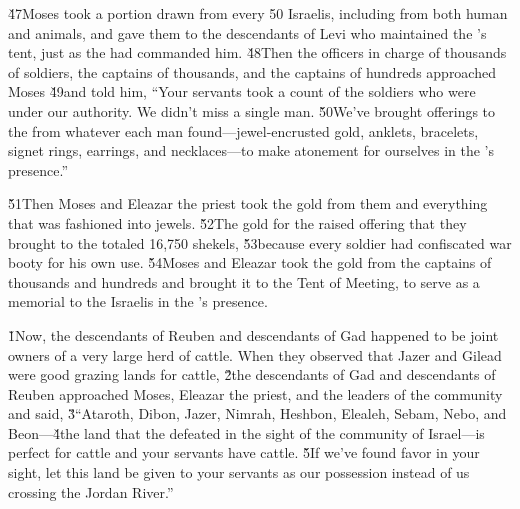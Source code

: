 \v{47}Moses took a portion drawn from every 50 Israelis, including from both human and animals, and gave them to the descendants of Levi who maintained the 's tent, just as the  had commanded him. \v{48}Then the officers in charge of thousands of soldiers, the captains of thousands, and the captains of hundreds approached Moses \v{49}and told him, ``Your servants took a count of the soldiers who were under our authority. We didn't miss a single man. \v{50}We've brought offerings to the  from whatever each man found---jewel-encrusted gold, anklets, bracelets, signet rings, earrings, and necklaces---to make atonement for ourselves in the 's presence.''

\v{51}Then Moses and Eleazar the priest took the gold from them and everything that was fashioned into jewels. \v{52}The gold for the raised offering that they brought to the  totaled 16,750 shekels, \v{53}because every soldier had confiscated war booty for his own use. \v{54}Moses and Eleazar took the gold from the captains of thousands and hundreds and brought it to the Tent of Meeting, to serve as a memorial to the Israelis in the 's presence.

\v{1}Now, the descendants of Reuben and descendants of Gad happened to be joint owners of a very large herd of cattle. When they observed that Jazer and Gilead were good grazing lands for cattle, \v{2}the descendants of Gad and descendants of Reuben approached Moses, Eleazar the priest, and the leaders of the community and said, \v{3}``Ataroth, Dibon, Jazer, Nimrah, Heshbon, Elealeh, Sebam, Nebo, and Beon---\v{4}the land that the  defeated in the sight of the community of Israel---is perfect for cattle and your servants have cattle. \v{5}If we've found favor in your sight, let this land be given to your servants as our possession instead of us crossing the Jordan River.''

